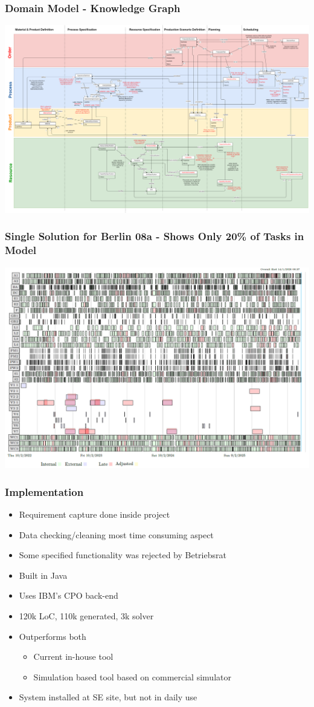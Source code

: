 \begin{frame}
\frametitle{Domain Model - Knowledge Graph}
\includegraphics[width=.8\textwidth]{imagesse/DomainModel}
\end{frame}

\begin{frame}
\frametitle{Single Solution for Berlin 08a - Shows Only 20\% of Tasks in Model}
\includegraphics[width=.75\textwidth]{imagesse/solution08apref2}
\end{frame}

\begin{frame}
\frametitle{Implementation}
\begin{itemize}
\item Requirement capture done inside project
\item Data checking/cleaning most time consuming aspect
\item Some specified functionality was rejected by Betriebsrat
\item Built in Java
\item Uses IBM's CPO back-end
\item 120k LoC, 110k generated, 3k solver
\item Outperforms both 
\begin{itemize}
\item Current in-house tool
\item Simulation based tool based on commercial simulator 
\end{itemize}
\item System installed at SE site, but not in daily use
\end{itemize}
\end{frame}


